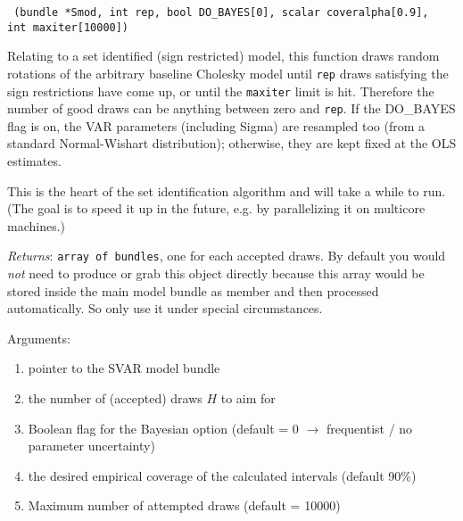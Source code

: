 \documentclass[a4paper,10pt]{article}
\newenvironment{funcdoc}[1]
{\noindent\hrulefill\newline\nopagebreak\texttt{#1}%
\nopagebreak\par\noindent\hrulefill%
\nopagebreak\par\nopagebreak\smallskip\nopagebreak\par}
{\bigskip}
\newcommand{\dtk}[1]{\texttt{\detokenize{#1}}}
\begin{document}
\begin{funcdoc}{ (bundle *Smod, int rep, bool
    DO\_BAYES[0], scalar coveralpha[0.9],\\
    int maxiter[10000])}
  
  \noindent Relating to a set identified (sign restricted) model, this function
   draws random rotations of the arbitrary baseline Cholesky model
  until \texttt{rep} draws satisfying the sign restrictions have come up,
  or until the \texttt{maxiter} limit is hit. Therefore the number of good 
  draws can be anything between zero and \texttt{rep}.
  If the DO\_BAYES flag is on, the VAR parameters (including Sigma)
  are resampled too (from a standard Normal-Wishart distribution); otherwise, 
  they are kept fixed at the OLS estimates. 
  
  This is the heart of the set identification algorithm 
  and will take a while to run. (The goal is to speed it up in the future, e.g. by 
  parallelizing it on multicore machines.)
  
  \emph{Returns}: \texttt{array of bundles}, one for each accepted draws. 
  By default you would \emph{not} need to produce or grab this object directly
  because this array would be stored inside the main model bundle as member 
  \dtk{acc_draws} and then processed automatically. So only use it under 
  special circumstances.

   \noindent Arguments:
\begin{enumerate}
\item pointer to the SVAR model bundle
\item the number of (accepted) draws $H$ to aim for
\item Boolean flag for the Bayesian option
  (default = 0 $\to$ frequentist / no parameter uncertainty)
\item the desired empirical coverage of the calculated intervals (default 90\%)
\item Maximum number of attempted draws (default = 10000)
\end{enumerate}
\end{funcdoc}
\end{document}
